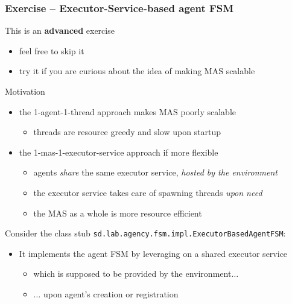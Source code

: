 \documentclass[presentation]{beamer}\mode<presentation>{\usetheme{AMSCesenaPurpleAndGold}}
\begin{document}
\begin{frame}[c, allowframebreaks]
    \frametitle{Exercise \currentExercise{} -- Executor-Service-based agent FSM}

    \begin{alertblock}{This is an \textbf{advanced} exercise}
        \begin{itemize}
            \item feel free to skip it
            \item try it if you are curious about the idea of making MAS scalable
        \end{itemize}
    \end{alertblock}

    \bigskip

    \begin{block}{Motivation}
        \begin{itemize}
            \item the 1-agent-1-thread approach makes MAS poorly scalable
            \begin{itemize}
                \item threads are resource greedy and slow upon startup
            \end{itemize}

            \item the 1-mas-1-executor-service approach if more flexible
            \begin{itemize}
                \item agents \emph{share} the same executor service, \emph{hosted by the environment}
                \item the executor service takes care of spawning threads \emph{upon need}
                \item the MAS as a whole is more resource efficient
            \end{itemize}
        \end{itemize}
    \end{block}

    \bigskip

    Consider the class stub \texttt{sd.lab.agency.fsm.impl.\alert{ExecutorBasedAgentFSM}}:
    \bigskip
    \begin{itemize}
        \item It implements the agent FSM by leveraging on a shared executor service
        \begin{itemize}
            \item which is supposed to be provided by the environment$\ldots$
            \item $\ldots$ upon agent's creation or registration
        \end{itemize}
    \end{itemize}


\end{frame}
\end{document}
